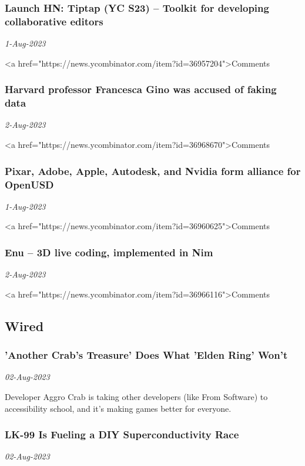 \subsubsection{Launch HN: Tiptap (YC S23) – Toolkit for developing collaborative editors \href{https://news.ycombinator.com/item?id=36957204}{}}
\textit{1-Aug-2023}

<a href="https://news.ycombinator.com/item?id=36957204">Comments
\subsubsection{Harvard professor Francesca Gino was accused of faking data \href{https://www.businessinsider.com/harvard-francesca-gino-fake-data-fraud-allegations-scholar-2023-7}{}}
\textit{2-Aug-2023}

<a href="https://news.ycombinator.com/item?id=36968670">Comments
\subsubsection{Pixar, Adobe, Apple, Autodesk, and Nvidia form alliance for OpenUSD \href{https://www.apple.com/newsroom/2023/08/pixar-adobe-apple-autodesk-and-nvidia-form-alliance-for-openusd/}{}}
\textit{1-Aug-2023}

<a href="https://news.ycombinator.com/item?id=36960625">Comments
\subsubsection{Enu – 3D live coding, implemented in Nim \href{https://github.com/dsrw/enu}{}}
\textit{2-Aug-2023}

<a href="https://news.ycombinator.com/item?id=36966116">Comments
\subsection{Wired \href{https://www.wired.com/}{}}
\subsubsection{'Another Crab’s Treasure' Does What 'Elden Ring' Won’t \href{https://www.wired.com/story/another-crabs-treasure-accessibility-aggro-crab-elden-ring/}{}}
\textit{02-Aug-2023}

Developer Aggro Crab is taking other developers (like From Software) to accessibility school, and it’s making games better for everyone.
\subsubsection{LK-99 Is Fueling a DIY Superconductivity Race \href{https://www.wired.com/story/inside-the-diy-race-to-replicate-lk-99/}{}}
\textit{02-Aug-2023}

